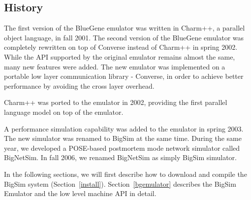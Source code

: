 \documentclass[10pt]{article}
\begin{document}
\subsection{History}
	The first version of the BlueGene emulator was written in Charm++, a
parallel object language, in fall 2001.  The second version of the BlueGene
emulator was completely rewritten on top of Converse instead of Charm++ in
spring 2002.  While the API supported by the original emulator remains almost
the same, many new features were added.
The new emulator was implemented on a portable low layer communication library
- Converse, in order to achieve better performance by avoiding the cross layer
overhead.

	Charm++ was ported to the emulator in 2002, providing the first
parallel language model on top of the emulator.

A performance simulation capability was added to the emulator in spring 2003.
The new simulator was renamed to BigSim at the same time.
During the same year, we developed a POSE-based postmortem mode network
simulator called BigNetSim. In fall 2006, we renamed BigNetSim as simply
BigSim simulator.

In the following sections, we will first describe how to download and compile
the BigSim system (Section~\ref{install}). Section~\ref{bgemulator} describes
the BigSim Emulator and the low level machine API in detail. 






% 






\end{document}
